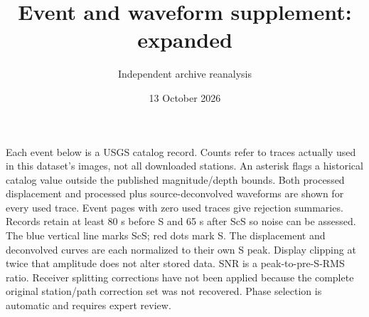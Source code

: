 \documentclass[10pt]{article}
\begin{document}
\title{Event and waveform supplement: expanded}\author{Independent archive reanalysis}\date{13 October 2026}\maketitle
Each event below is a USGS catalog record. Counts refer to traces actually
used in this dataset's images, not all downloaded stations. An asterisk flags a
historical catalog value outside the published magnitude/depth bounds. Both
processed displacement and processed plus source-deconvolved waveforms are shown
for every used trace. Event pages with zero used traces give rejection summaries.
Records retain at least 80 s before S and 65 s after ScS so noise can be assessed.
The blue vertical line marks ScS; red dots mark S. The displacement and deconvolved
curves are each normalized to their own S peak. Display clipping at twice that
amplitude does not alter stored data. SNR is a peak-to-pre-S-RMS ratio.
Receiver splitting corrections have not been applied because the complete original station/path
correction set was not recovered. Phase selection is automatic and requires expert review.
\begingroup\small\setlength{\tabcolsep}{3pt}
\end{document}
